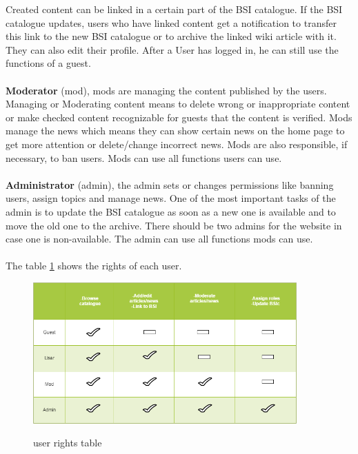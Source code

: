 Created content can be linked in a certain part of the BSI catalogue. 
If the BSI catalogue updates, users who have linked content get a notification to transfer this link to the new BSI catalogue or to archive the linked wiki article with it.
They can also edit their profile. 
After a User has logged in, he can still use the functions of a guest.
\\\\
\textbf{Moderator} (mod), mods are managing the content published by the users.
Managing or Moderating content means to delete wrong or inappropriate content or make checked content recognizable for guests that the content is verified.  
Mods manage the news which means they can show certain news on the home page to get more attention or delete/change incorrect news. 
Mods are also responsible, if necessary, to ban users. 
Mods can use all functions users can use.
\\\\
\textbf{Administrator} (admin), the admin sets or changes permissions like banning users, assign topics and manage news.
One of the most important tasks of the admin is to update the BSI catalogue as soon as a new one is available and to move the old one to the archive.  There should be two admins for the website in case one is non-available.
The admin can use all functions mods can use. 
\\\\
The table \ref{fig:usertypes} shows the rights of each user.

\begin{figure}[h]
    \centering
    \includegraphics[width=0.9\textwidth]{Pictures/user_types}
    \label{fig:usertypes}
    \caption{user rights table}
\end{figure}


